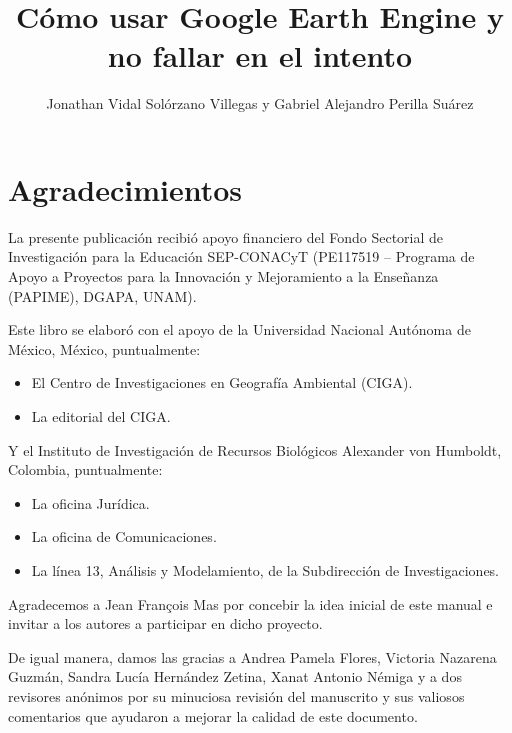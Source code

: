\documentclass[
  12pt,
  letterpaper,
  twoside]{book}
\title{Cómo usar Google Earth Engine y no fallar en el intento}
\author{Jonathan Vidal Solórzano Villegas y Gabriel Alejandro Perilla Suárez}
\date{}
\providecommand{\tightlist}{%
  \setlength{\itemsep}{0pt}\setlength{\parskip}{0pt}}
\begin{document}
\maketitle

\renewcommand*\contentsname{Índice}
{
\hypersetup{linkcolor=black}
\setcounter{tocdepth}{1}
\tableofcontents
}
\setlength{\aweboxleftmargin}{0.1\linewidth}
\setlength{\aweboxcontentwidth}{0.85\linewidth}
\setlength{\aweboxvskip}{1mm}
\setlength{\aweboxrulewidth}{5pt}

\newpage

\hypertarget{agradecimientos}{%
\section*{Agradecimientos}\label{agradecimientos}}

La presente publicación recibió apoyo financiero del Fondo Sectorial de Investigación para la Educación SEP-CONACyT (PE117519 -- Programa de Apoyo a Proyectos para la Innovación y Mejoramiento a la Enseñanza (PAPIME), DGAPA, UNAM).

Este libro se elaboró con el apoyo de la Universidad Nacional Autónoma de México, México, puntualmente:

\begin{itemize}
\tightlist
\item
  El Centro de Investigaciones en Geografía Ambiental (CIGA).
\item
  La editorial del CIGA.
\end{itemize}

Y el Instituto de Investigación de Recursos Biológicos Alexander von Humboldt, Colombia, puntualmente:

\begin{itemize}
\tightlist
\item
  La oficina Jurídica.
\item
  La oficina de Comunicaciones.
\item
  La línea 13, Análisis y Modelamiento, de la Subdirección de Investigaciones.
\end{itemize}

Agradecemos a Jean François Mas por concebir la idea inicial de este manual e invitar a los autores a participar en dicho proyecto.

De igual manera, damos las gracias a Andrea Pamela Flores, Victoria Nazarena Guzmán, Sandra Lucía Hernández Zetina, Xanat Antonio Némiga y a dos revisores anónimos por su minuciosa revisión del manuscrito y sus valiosos comentarios que ayudaron a mejorar la calidad de este documento.
\end{document}

